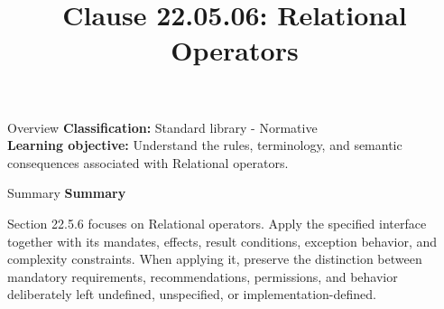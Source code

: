 \documentclass[10pt,letterpaper]{article}
\title{Clause 22.05.06: Relational Operators}
\author{}
\date{}
\begin{document}
\maketitle
\begin{CornellOverviewBox}{Overview}
\textbf{Classification:} Standard library - Normative\\[2pt]
\textbf{Learning objective:} Understand the rules, terminology, and semantic consequences associated with Relational operators.
\end{CornellOverviewBox}\begin{CornellSummaryBox}{Summary}
{\sffamily\bfseries\color{Accent} Summary}\par\vspace{3pt}Section 22.5.6 focuses on Relational operators. Apply the specified interface together with its mandates, effects, result conditions, exception behavior, and complexity constraints. When applying it, preserve the distinction between mandatory requirements, recommendations, permissions, and behavior deliberately left undefined, unspecified, or implementation-defined.
\end{CornellSummaryBox}
\end{document}
